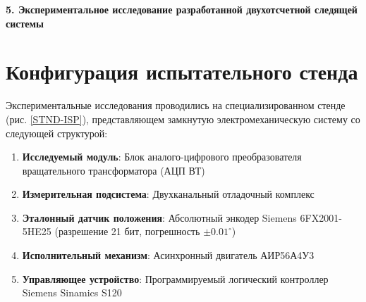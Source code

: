 


\newpage
\begin{center}
  \textbf{\large 5.  Экспериментальное исследование разработанной двухотсчетной следящей системы}
\end{center}

\section{Конфигурация испытательного стенда}
Экспериментальные исследования проводились на специализированном стенде (рис. \ref{STND-ISP}), представляющем замкнутую электромеханическую систему 
со следующей структурой:
\begin{enumerate}
    \item \textbf{Исследуемый модуль}: Блок аналого-цифрового преобразователя вращательного трансформатора (АЦП ВТ)
    \item \textbf{Измерительная подсистема}: Двухканальный отладочный комплекс
    \item \textbf{Эталонный датчик положения}: Абсолютный энкодер Siemens 6FX2001-5HE25 (разрешение 21 бит, погрешность $\pm0.01^\circ$)
    \item \textbf{Исполнительный механизм}: Асинхронный двигатель АИР56А4У3 
    \item \textbf{Управляющее устройство}: Программируемый логический контроллер Siemens Sinamics S120
\end{enumerate}


